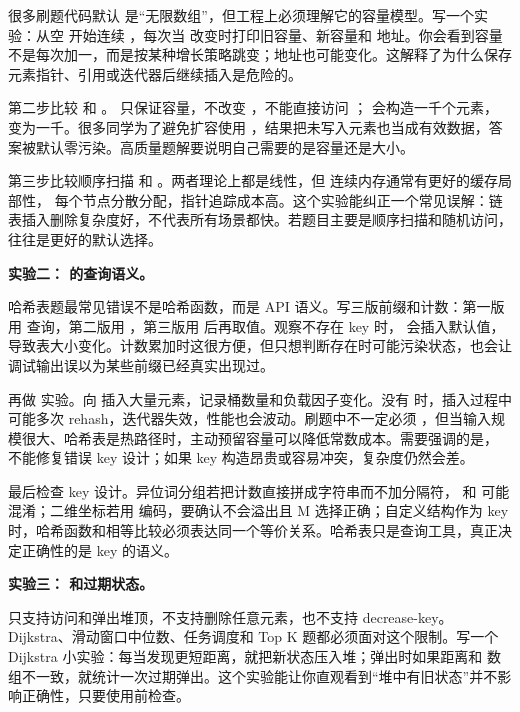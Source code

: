 很多刷题代码默认  是“无限数组”，但工程上必须理解它的容量模型。写一个实验：从空  开始连续 ，每次当  改变时打印旧容量、新容量和  地址。你会看到容量不是每次加一，而是按某种增长策略跳变；地址也可能变化。这解释了为什么保存元素指针、引用或迭代器后继续插入是危险的。

第二步比较  和 。 只保证容量，不改变 ，不能直接访问 ； 会构造一千个元素， 变为一千。很多同学为了避免扩容使用 ，结果把未写入元素也当成有效数据，答案被默认零污染。高质量题解要说明自己需要的是容量还是大小。

第三步比较顺序扫描  和 。两者理论上都是线性，但  连续内存通常有更好的缓存局部性， 每个节点分散分配，指针追踪成本高。这个实验能纠正一个常见误解：链表插入删除复杂度好，不代表所有场景都快。若题目主要是顺序扫描和随机访问， 往往是更好的默认选择。

\noindent\textbf{实验二： 的查询语义。}

哈希表题最常见错误不是哈希函数，而是 API 语义。写三版前缀和计数：第一版用  查询，第二版用 ，第三版用  后再取值。观察不存在 key 时， 会插入默认值，导致表大小变化。计数累加时这很方便，但只想判断存在时可能污染状态，也会让调试输出误以为某些前缀已经真实出现过。

再做  实验。向  插入大量元素，记录桶数量和负载因子变化。没有  时，插入过程中可能多次 rehash，迭代器失效，性能也会波动。刷题中不一定必须 ，但当输入规模很大、哈希表是热路径时，主动预留容量可以降低常数成本。需要强调的是， 不能修复错误 key 设计；如果 key 构造昂贵或容易冲突，复杂度仍然会差。

最后检查 key 设计。异位词分组若把计数直接拼成字符串而不加分隔符， 和  可能混淆；二维坐标若用  编码，要确认不会溢出且 M 选择正确；自定义结构作为 key 时，哈希函数和相等比较必须表达同一个等价关系。哈希表只是查询工具，真正决定正确性的是 key 的语义。

\noindent\textbf{实验三： 和过期状态。}

 只支持访问和弹出堆顶，不支持删除任意元素，也不支持 decrease-key。Dijkstra、滑动窗口中位数、任务调度和 Top K 题都必须面对这个限制。写一个 Dijkstra 小实验：每当发现更短距离，就把新状态压入堆；弹出时如果距离和  数组不一致，就统计一次过期弹出。这个实验能让你直观看到“堆中有旧状态”并不影响正确性，只要使用前检查。

